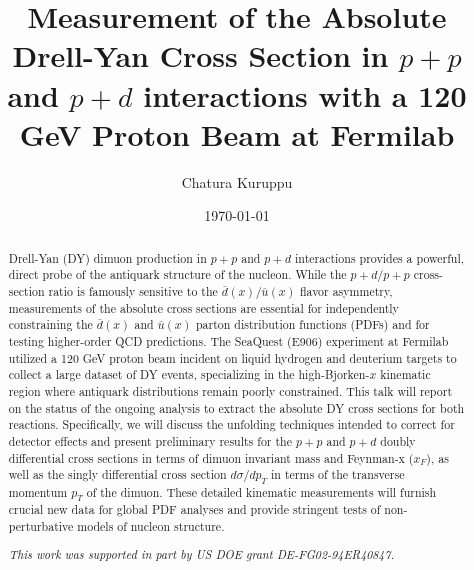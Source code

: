\documentclass[11pt]{article}
\begin{document}
\title{Measurement of the Absolute Drell-Yan Cross Section in $p+p$ and $p+d$ interactions with a 120 GeV Proton Beam at Fermilab}
\author[1]{Chatura Kuruppu} 

\date{\today}
\maketitle
\begin{abstract}
Drell-Yan (DY) dimuon production in $p+p$ and $p+d$ interactions provides a powerful, direct probe of the antiquark structure of the nucleon. 
While the $p+d/p+p$ cross-section ratio is famously sensitive to the $\bar{d}(x)/\bar{u}(x)$ flavor asymmetry, measurements of the absolute cross sections are essential for independently constraining the $\bar{d}(x)$ and $\bar{u}(x)$ parton distribution functions (PDFs) and for testing higher-order QCD predictions. 
The SeaQuest (E906) experiment at Fermilab utilized a 120 GeV proton beam incident on liquid hydrogen and deuterium targets to collect a large dataset of DY events, specializing in the high-Bjorken-$x$ kinematic region where antiquark distributions remain poorly constrained. 
This talk will report on the status of the ongoing analysis to extract the absolute DY cross sections for both reactions. 
Specifically, we will discuss the unfolding techniques intended to correct for detector effects and present preliminary results for the $p+p$ and $p+d$ doubly differential cross sections in terms of dimuon invariant mass and Feynman-x ($x_F$), as well as the singly differential cross section $d\sigma/dp_T$ in terms of the transverse momentum $p_T$ of the dimuon. 
These detailed kinematic measurements will furnish crucial new data for global PDF analyses and provide stringent tests of non-perturbative models of nucleon structure.

\vspace{1em}
\noindent \textit{This work was supported in part by US DOE grant DE-FG02-94ER40847.}
\end{abstract}
\end{document}
